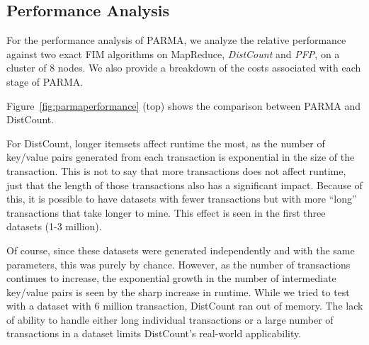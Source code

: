 \subsection{Performance Analysis} 

For the performance analysis of PARMA, we analyze the relative
performance against two exact FIM algorithms on MapReduce,
\emph{DistCount} and \emph{PFP}, on a cluster of 8 nodes. We also provide a breakdown of the costs
associated with each stage of PARMA.


Figure~\ref{fig:parmaperformance} (top) shows the comparison
between PARMA and DistCount.

For DistCount,
longer itemsets affect runtime the most, as
the number of key/value pairs generated from each transaction is
exponential in the size of the transaction. This is not to say that more
transactions does not affect runtime, just that the length of those
transactions also has a significant impact. Because of this, it is
possible to have datasets with fewer transactions but with more ``long''
transactions that take longer to mine. This effect is seen in the first
three datasets (1-3 million). 

Of course, since these datasets
were generated independently and with the same parameters,
this was purely by chance. However, as the number of transactions continues to
increase, the exponential growth in the number of intermediate key/value
pairs is seen by the sharp increase in runtime. While we tried to test
with a dataset with 6 million transaction, DistCount ran out of memory.
The lack of ability to handle either long individual transactions or a
large number of transactions in a dataset limits DistCount's
real-world applicability. 

